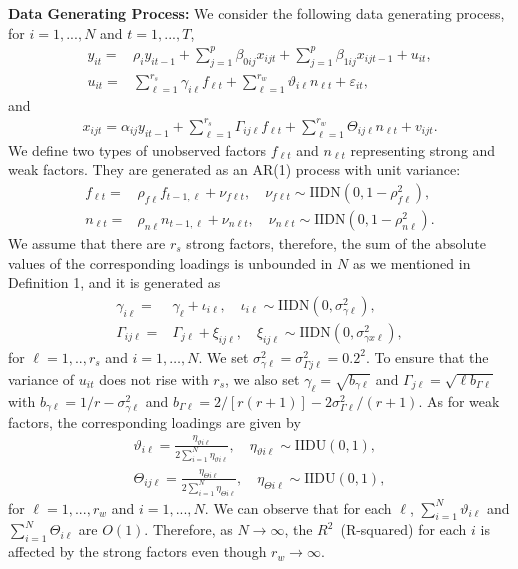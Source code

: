\documentclass[11pt,a4paper]{article}
\newcommand{\veps}{\varepsilon}
\theoremstyle{definition}
\begin{document}
\noindent
\textbf{Data Generating Process:}
We consider the following data generating process,
for $i=1,...,N$ and $t=1,...,T$,
\begin{align*}
y_{it}=&\rho_iy_{it-1}+\sum_{j=1}^p\beta_{0ij}x_{ijt}+\sum_{j=1}^p\beta_{1ij}x_{ijt-1}+u_{it},\\
u_{it}=&\sum_{\ell=1}^{r_{s}}\gamma_{i\ell}f_{\ell t}+\sum_{\ell=1}^{r_{w}}\vartheta_{i\ell}n_{\ell t}+\veps_{it},
\end{align*}
and
\begin{align*}
x_{ijt}=\alpha_{ij}y_{it-1}+\sum_{\ell=1}^{r_s}\Gamma_{ij\ell}f_{\ell t}+\sum_{\ell=1}^{r_{w}}\Theta_{ij\ell}n_{\ell t}+v_{ijt}.
\end{align*}
We define two types of unobserved factors $f_{\ell t}$ and $n_{\ell t}$ representing strong and weak factors. They are generated  as an AR(1) process with unit variance:
\begin{align*}
f_{\ell t} =&\rho_{f\ell}f_{t-1, \ell} +\nu_{f\ell t},\quad \nu_{f\ell t}\sim \mathrm{IIDN} (0, 1-\rho^{2}_{f\ell}), \\
n_{\ell t} =&\rho_{n\ell}n_{t-1, \ell} +\nu_{n\ell t},\quad \nu_{n\ell t}\sim \mathrm{IIDN} (0, 1-\rho^{2}_{n\ell}).
\end{align*}
We assume that there are $r_{s}$ strong factors, therefore, the sum of the absolute values of the corresponding loadings is unbounded in $N$ as we mentioned in Definition 1, and it is generated as
\begin{align*}
\gamma_{i\ell} =& \gamma_{\ell}+\iota_{i\ell},\quad \iota_{i\ell} \sim \mathrm{IIDN} (0, \sigma^{2}_{\gamma\ell}),\\
\Gamma_{ij\ell} =& \Gamma_{j\ell}+\xi_{ij\ell},\quad \xi_{ij\ell} \sim \mathrm{IIDN} (0, \sigma^{2}_{\gamma x \ell}),
 \end{align*}
for $\ell=1,.., r_s$ and $i=1,\ldots,N$. We set $\sigma^{2}_{\gamma\ell}=\sigma^{2}_{\Gamma j\ell}=0.2^2$. To ensure that the variance of $u_{it}$ does not rise with $r_{s}$, we also set
$\gamma_{\ell}=\sqrt{b_{\gamma\ell}}$  and
$\Gamma_{j\ell}=\sqrt{\ell b_{\Gamma \ell}}$ with
$b_{\gamma\ell}=1/r - \sigma^{2}_{\gamma\ell}$ and
$b_{\Gamma\ell}=2/[r(r+1)]-2\sigma^{2}_{\Gamma  \ell}/(r+1)$. As for weak factors, the corresponding loadings are given by
\begin{align*}
\vartheta_{i\ell}=\frac{\eta_{\vartheta i\ell}}{2\sum_{i=1}^N\eta_{\vartheta i\ell}},\quad \eta_{\vartheta i\ell}\sim\mathrm{IIDU}(0,1), \\
\Theta_{ij\ell}=\frac{\eta_{\Theta i\ell}}{2\sum_{i=1}^N\eta_{\Theta i\ell}},\quad \eta_{\Theta i\ell}\sim\mathrm{IIDU}(0,1),
\end{align*}
for $\ell =1,...,r_{w}$ and $i=1,...,N$. We can observe that for each $\ell$, $\sum_{i=1}^N\vartheta_{i\ell}$ and $\sum_{i=1}^N\Theta_{i\ell}$ are $O(1)$. Therefore, as $N\rightarrow\infty$, the $R^2$~(R-squared) for each $i$ is affected by the strong factors even though $r_{w}\rightarrow\infty$.
\end{document}
